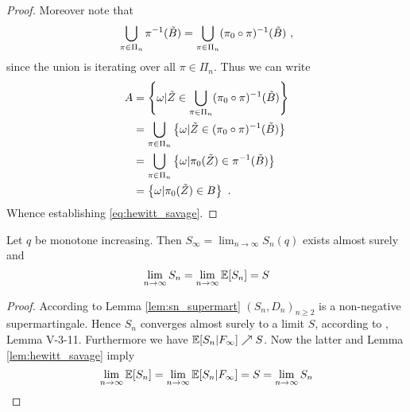 \begin{lemma}
\begin{proof}
		Moreover note that 
		$$\bigcup\limits_{\pi\in\Pi_n}\pi^{-1}(\tilde{B}) = \bigcup\limits_{\pi\in\Pi_n}(\pi_0\circ\pi)^{-1}(\tilde{B})\textrm{ ,}$$
		since the union is iterating over all $\pi\in\Pi_n$. Thus we can write
		\begin{align*}
		A &= \left\{\omega | \tilde{Z} \in \bigcup\limits_{\pi\in\Pi_n}(\pi_0\circ\pi)^{-1}(\tilde{B})\right\}\\
		&= \bigcup\limits_{\pi\in\Pi_n}\left\{\omega | \tilde{Z} \in (\pi_0\circ\pi)^{-1}(\tilde{B})\right\}\\
		&= \bigcup\limits_{\pi\in\Pi_n}\left\{\omega | \pi_0(\tilde{Z}) \in \pi^{-1}(\tilde{B})\right\}\\
		&= \left\{\omega | \pi_0(\tilde{Z}) \in B\right\}\textrm{ .}
		\end{align*}		
		Whence establishing \eqref{eq:hewitt_savage}.
	\end{proof}
\end{lemma}
%
\begin{thm}\label{thm:ex_limit_sn}
	Let $q$ be monotone increasing. Then $S_\infty = \lim_{n\to\infty} S_n(q)$ exists almost surely and 
	$$\lim\limits_{n\to\infty} S_n = \lim\limits_{n\to\infty} \mathbb{E}[S_n] = S$$
	\begin{proof}
		According to Lemma \ref{lem:sn_supermart} $(S_n,D_n)_{n\geq 2}$ is a non-negative supermartingale. Hence $S_n$ converges almost surely to a limit $S$, according to \cite{neveu1975discrete}, Lemma V-3-11. Furthermore we have $\mathbb{E}[S_n|F_\infty] \nearrow S$. Now the latter and Lemma \ref{lem:hewitt_savage} imply
		$$\lim\limits_{n\to\infty}\mathbb{E}[S_n] = \lim\limits_{n\to\infty}\mathbb{E}[S_n|F_\infty] = S = \lim\limits_{n\to\infty}S_n$$		
	\end{proof}
\end{thm}
%